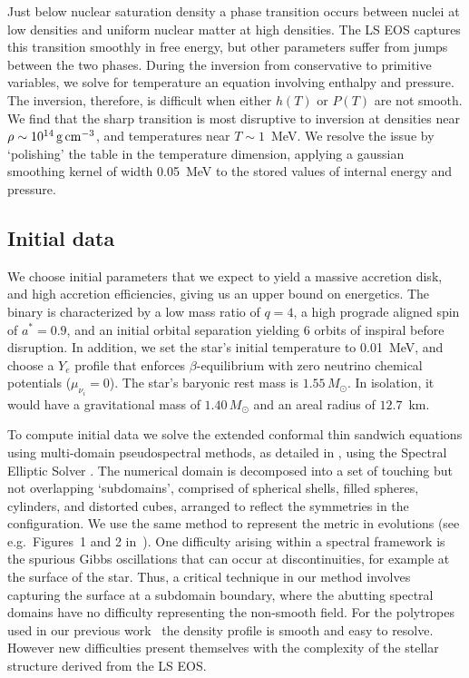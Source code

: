 Just below nuclear saturation density a phase transition occurs
between nuclei at low densities and uniform nuclear matter at high densities.
The LS EOS captures this transition smoothly in free energy, but other parameters suffer from
jumps between the two phases. During the inversion from conservative to primitive variables,
we solve for temperature an equation involving enthalpy and pressure.
The inversion, therefore, is difficult
when either $h(T)$ or $P(T)$ are not smooth. We find that the sharp transition
is most disruptive to inversion at densities near $\rho \sim 10^{14}\rm\,g\,cm^{-3}$,
and temperatures near $T \sim 1$~MeV.
We resolve the issue by `polishing' the table in the temperature dimension,
applying a gaussian smoothing kernel of width 0.05~MeV to the stored values
of internal energy and pressure.

\subsection{Initial data}
\label{sec:ID}

We choose initial parameters that we expect to yield a massive accretion disk,
and high accretion efficiencies, giving us an upper bound on energetics.
The binary is characterized by a low mass ratio of $q=4$,
a high prograde aligned spin of $a^{*}=0.9$,
and an initial orbital separation yielding 6 orbits of inspiral before disruption.
In addition, we set the star's initial temperature to 0.01~MeV, and choose
a $Y_e$ profile that enforces $\beta$-equilibrium with zero neutrino
chemical potentials ($\mu_{\nu_i}=0$).
The star's baryonic rest mass is $1.55\,M_\odot$.  In isolation, it
would have a gravitational mass of $1.40\,M_\odot$ and an areal radius
of $12.7$~km.

To compute initial data we solve the extended conformal thin sandwich equations
using multi-domain pseudospectral methods, as detailed in
\cite{FoucartEtAl:2008}, using the Spectral Elliptic Solver
\citep{Pfeiffer2003a,Pfeiffer2003,Pfeiffer2004}.
The numerical domain is decomposed into a set of touching but not overlapping
`subdomains', comprised of spherical shells, filled spheres, cylinders,
and distorted cubes, arranged to reflect the symmetries in the configuration.
We use the same method to represent
the metric in evolutions (see e.g.\ Figures~1 and 2 in~\citealt{Foucart:2013a}).
One difficulty arising within a spectral framework
is the spurious Gibbs oscillations that can occur at discontinuities,
for example at the surface of the star.
Thus, a critical technique in our method involves capturing the
surface at a subdomain boundary, where the abutting spectral domains
have no difficulty representing the non-smooth field.
For the polytropes used in our previous
work~\citep{Duez:2009yy,Foucart:2010eq,FoucartEtAl:2011,Foucart2012,Foucart:2013a}
the density profile is smooth and
easy to resolve.  However new difficulties present themselves
with the complexity of the stellar structure derived from the LS EOS.

